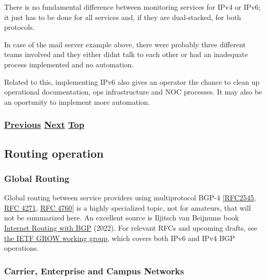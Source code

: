 \documentclass[
]{article}
\begin{document}
There is no fundamental difference between monitoring services for IPv4
or IPv6; it just has to be done for all services and, if they are
dual-stacked, for both protocols.

In case of the mail server example above, there were probably three
different teams involved and they either didn\textquotesingle t talk to
each other or had an inadequate process implemented and no automation.

Related to this, implementing IPv6 also gives an operator the chance to
clean up operational documentation, ops infrastructure and NOC
processes. It may also be an oportunity to implement more automation.

\subsubsection{\texorpdfstring{\hyperref[remote-configuration]{Previous}
\hyperref[routing-operation]{Next}
\hyperref[management-and-operations]{Top}}{Previous Next Top}}\label{previous-next-top-28}

\pagebreak

\subsection{Routing operation}\label{routing-operation}

\subsubsection{Global Routing}\label{global-routing}

Global routing between service providers using multiprotocol BGP-4
{[}\href{https://www.rfc-editor.org/info/rfc2545}{RFC2545},
\href{https://www.rfc-editor.org/info/rfc4271}{RFC 4271},
\href{https://www.rfc-editor.org/info/rfc4760}{RFC 4760}{]} is a highly
specialized topic, not for amateurs, that will not be summarized here.
An excellent source is Iljitsch van Beijnum\textquotesingle s book
\href{https://www.iljitsch.com/2022/11-18-new-e-book-internet-routing-with-bgp.html}{Internet
Routing with BGP} (2022). For relevant RFCs and upcoming drafts, see
\href{https://datatracker.ietf.org/wg/grow/documents/}{the IETF GROW
working group}, which covers both IPv6 and IPv4 BGP operations.

\subsubsection{Carrier, Enterprise and Campus
Networks}\label{carrier-enterprise-and-campus-networks}
\end{document}
